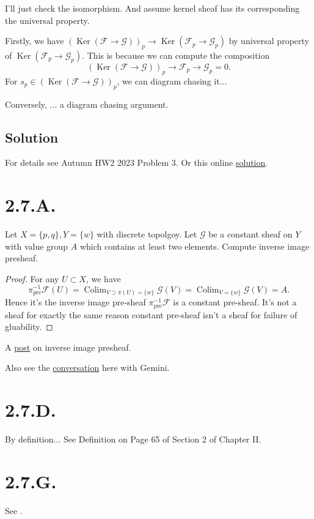 I'll just check the isomorphism. And assume kernel sheaf has its corresponding the universal property.

Firstly, we have $(\operatorname{Ker}(\mathcal F\to\mathcal G))_p\to \operatorname{Ker}(\mathcal F_p\to\mathcal G_p)$ by universal property of $\operatorname{Ker}(\mathcal F_p\to\mathcal G_p)$. This is because we can compute the composition 
\[(\operatorname{Ker}(\mathcal F\to\mathcal G))_p\to \mathcal F_p\to\mathcal G_p=0.\] For $s_p\in(\operatorname{Ker}(\mathcal F\to\mathcal G))_p$, we can diagram chasing it... 

Conversely, ... a diagram chasing argument. 

\subsection{Solution}

For details see Autumn HW2 2023 Problem 3. Or this online \href{https://www.math.utah.edu/~zwick/Classes/Hartshorne/Section2_1.pdf}{solution}.

\section{2.7.A.}
\begin{exercise}
	Let $X=\{p,q\}, Y=\{w\}$ with discrete topolgoy. Let $\mathscr G$ be a constant sheaf on $Y$ with value group $A$ which contains at least two elements. Compute inverse image presheaf.
\end{exercise}
\begin{proof}
	For any $U\subset X$, we have 
	\[\pi_{\text{pre}}^{-1}\mathscr F(U)=\operatorname{Colim}_{V\supset \pi(U)=\{w\}}\mathscr G(V)=\operatorname{Colim}_{V=\{w\}}\mathscr G(V)=A.\]
	Hence it's the inverse image pre-sheaf $\pi_{\text{pre}}^{-1}\mathscr F$ is a constant pre-sheaf. It's not a sheaf for exactly the same reason constant pre-sheaf isn't a sheaf for failure of gluability.
\end{proof}

\begin{remark}
A \href{https://math.stackexchange.com/questions/439769/inverse-image-presheaf}{post} on inverse image presheaf.

Also see the \href{https://gemini.google.com/share/93948b2a5dd7}{conversation} here with Gemini.
\end{remark}

\section{2.7.D.}\label{2.7.D.}

By definition... See \cite{hartshorne2013algebraic} Definition on Page 65 of Section 2 of Chapter II.

\section{2.7.G.}

See .